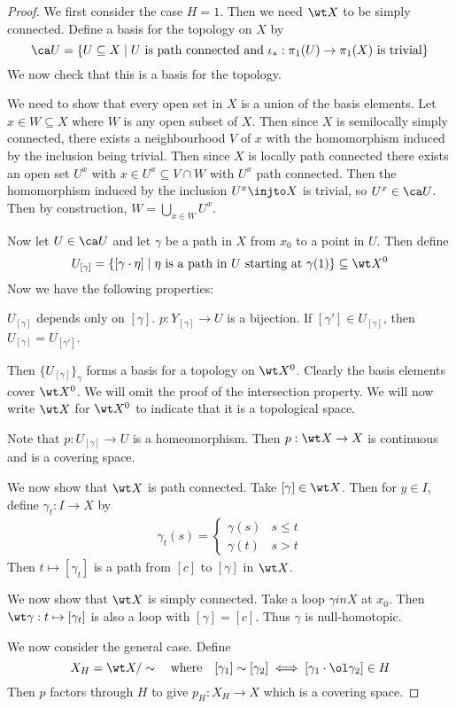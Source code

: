 \begin{proof}
	We first consider the case $H=1$.
	Then we need $\wt X$ to be simply connected.
	Define a basis for the topology on $X$ by
	\[\ca U = \{U \subseteq X \mid U \text{ is path connected and } \iota_*: \pi_1(U) \to \pi_1(X) \text{ is trivial}\}\]
	We now check that this is a basis for the topology.
	
	We need to show that every open set in $X$ is a union of the basis elements.
	Let $x \in W \subseteq X$ where $W$ is any open subset of $X$.
	Then since $X$ is semilocally simply connected, there exists a neighbourhood $V$ of $x$ with the homomorphism induced by the inclusion being trivial.
	Then since $X$ is locally path connected there exists an open set $U^x$ with $x \in U^x \subseteq V \cap W$ with $U^x$ path connected.
	Then the homomorphism induced by the inclusion $U^x \injto X$ is trivial, so $U^x \in \ca U$.
	Then by construction, $W = \bigcup_{x \in W} U^x$.
	
	Now let $U \in \ca U$ and let $\gamma$ be a path in $X$ from $x_0$ to a point in $U$.
	Then define
	\[U_{[\gamma]} = \{[\gamma\cdot\eta] \mid \eta \text{ is a path in } U \text{ starting at } \gamma(1)\} \subseteq \wt X^0\]
	Now we have the following properties:
	\begin{itm}
		\io $U_{[\gamma]}$ depends only on $[\gamma]$.
		\io $p: Y_{[\gamma]} \to U$ is a bijection.
		\io If $[\gamma'] \in U_{[\gamma]}$, then $U_{[\gamma]} = U_{[\gamma']}$.
	\end{itm}
	Then $\{U_{[\gamma]}\}_\gamma$ forms a basis for a topology on $\wt X^0$.
	Clearly the basis elements cover $\wt X^0$.
	We will omit the proof of the intersection property.
	We will now write $\wt X$ for $\wt X^0$ to indicate that it is a topological space.
	
	Note that $p: U_{[\gamma]} \to U$ is a homeomorphism.
	Then $p: \wt X \to X$ is continuous and is a covering space.
	
	We now show that $\wt X$ is path connected.
	Take $[\gamma] \in \wt X$.
	Then for $y \in I$, define $\gamma_t: I \to X$ by
	\begin{align*}
		\gamma_t(s) =
		\begin{cases}
			\gamma(s) & s \leq t \\
			\gamma(t) & s>t
		\end{cases}
	\end{align*}
	Then $t \mapsto [\gamma_t]$ is a path from $[c]$ to $[\gamma]$ in $\wt X$.
	
	We now show that $\wt X$ is simply connected.
	Take a loop $\gamma in X$ at $x_0$.
	Then $\wt \gamma: t \mapsto [\gamma_t]$ is also a loop with $[\gamma]=[c]$.
	Thus $\gamma$ is null-homotopic.
	
	We now consider the general case.
	Define
	\[X_H = \wt X/\sim \quad \text{where} \quad [\gamma_1]\sim[\gamma_2] \iff [\gamma_1\cdot\ol\gamma_2] \in H\]
	Then $p$ factors through $H$ to give $p_H: X_H \to X$ which is a covering space.
\end{proof}